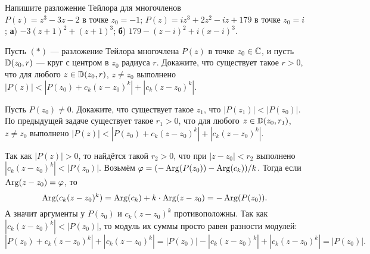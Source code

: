\documentclass[a4paper, 12pt]{article}
\begin{document}












Напишите разложение Тейлора для многочленов
\\
 $P(z) = z^3 - 3z - 2$ в точке $z_0 = -1$;
 $P(z) = iz^3 + 2z^2 - iz + 179$ в точке $z_0 = i$;
\textbf{а})
$-3 (z+1)^2 + (z+1)^3$;
\textbf{б})
$179 - (z-i)^2 + i(x-i)^3$.













Пусть $(*)$ --- разложение Тейлора многочлена $P(z)$ в точке $z_0\in\mathbb{C}$, и пусть
${\Bbb D}(z_0,r)$ --- круг с центром в $z_0$ радиуса $r$.
Докажите, что  существует такое $r>0$, что для любого $z\in{\Bbb D}(z_0, r)$,
$z\ne z_0$ выполнено $|P(z)|<|P(z_0)+c_k(z-z_0)^k|+|c_k(z-z_0)^k|.$
















Пусть $P(z_0)\ne0$.
Докажите, что  существует такое $z_1$, что $|P(z_1)|<|P(z_0)|$.
По предыдущей задаче существует такое $r_1>0$, что для любого $z\in{\Bbb D}(z_0, r_1)$,
$z\ne z_0$ выполнено $|P(z)|<|P(z_0)+c_k(z-z_0)^k|+|c_k(z-z_0)^k|.$

Так как $|P(z)|>0$, то найдётся такой $r_2>0$, что при $|z-z_0|<r_2$ выполнено $|c_k(z-z_0)^k| < |P(z_0)|$.
Возьмём $\varphi = (-\operatorname{Arg}(P(z_0)) - \operatorname{Arg}(c_k))/k$.
Тогда если $\operatorname{Arg}(z-z_0) = \varphi$, то
$$\operatorname{Arg}(c_k(z-z_0)^k) = \operatorname{Arg}(c_k) + k\cdot \operatorname{Arg}(z-z_0) = -\operatorname{Arg}(P(z_0)).$$
А значит аргументы у $P(z_0)$ и $c_k(z-z_0)^k$ противоположны.
Так как $|c_k(z-z_0)^k| < |P(z_0)|$, то модуль их суммы просто равен разности модулей:
$$
|P(z_0)+c_k(z-z_0)^k|+|c_k(z-z_0)^k| =  |P(z_0)| - |c_k(z-z_0)^k|+|c_k(z-z_0)^k|  = |P(z_0)|.
$$
\end{document}
